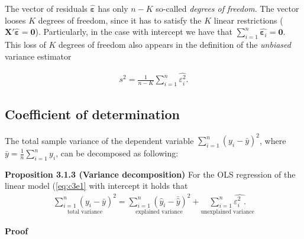 \documentclass[
]{book}
\begin{document}
\hfill\break

The vector of residuals \(\hat{\boldsymbol{\varepsilon}}\) has only \(n-K\) so-called \emph{degrees of freedom}. The vector looses \(K\) degrees of freedom, since it has to
satisfy the \(K\) linear restrictions (\(\mathbf{X}'\hat{\boldsymbol{\varepsilon}}=\mathbf{0}\)).
Particularly, in the case with intercept we have that
\(\sum_{i=1}^n\hat{\boldsymbol{\varepsilon}_i}=\mathbf{0}\).\\
This loss of \(K\) degrees of freedom also appears in the definition of
the \emph{unbiased} variance estimator

\begin{align}
s^2 = \frac{1}{n-K}\sum_{i=1}^n\hat{\varepsilon_i^2}.
\label{eq:c3e8}
\end{align}

\hypertarget{coefficient-of-determination}{%
\subsection{Coefficient of determination}\label{coefficient-of-determination}}

The total sample variance of the dependent variable
\(\sum_{i=1}^n\left(y_i-\bar{y}\right)^2\), where
\(\bar{y}=\frac{1}{n}\sum_{i=1}^ny_i\), can be decomposed as following:

\textbf{Proposition 3.1.3 (Variance decomposition)}
For the OLS regression of the linear model (\eqref{eq:c3e1} with intercept it holds that
\begin{align*}
  \underset{\text{total variance}}{\sum_{i=1}^n\left(y_i-\bar{y}\right)^2} = \underset{\text{explained variance}}{\sum_{i=1}^n\left(\hat{y}_i-\bar{\hat{y}}\right)^2}+\underset{\text{unexplained variance}}{\sum_{i=1}^n\hat{\varepsilon_i^2 \,\,.}}
\end{align*}

\textbf{Proof}
\end{document}
